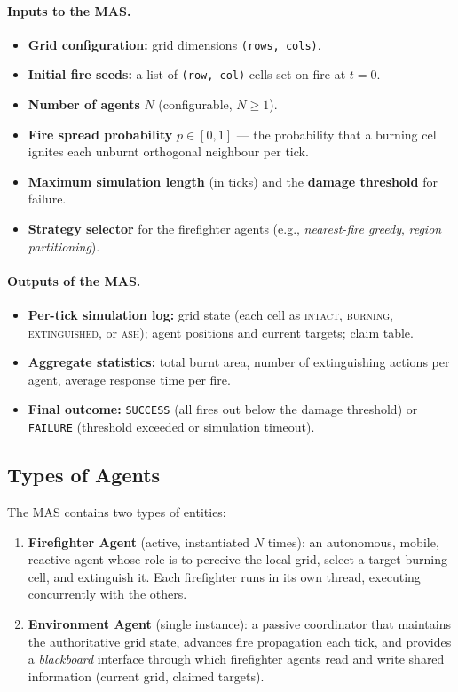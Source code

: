 \documentclass[a4paper, 11pt]{article}
\begin{document}
\paragraph{Inputs to the MAS.}
\begin{itemize}[leftmargin=*]
\item \textbf{Grid configuration:} grid dimensions \texttt{(rows, cols)}.
\item \textbf{Initial fire seeds:} a list of \texttt{(row, col)} cells set
on fire at $t=0$.
\item \textbf{Number of agents} $N$ (configurable, $N \geq 1$).
\item \textbf{Fire spread probability} $p \in [0, 1]$ --- the probability
that a burning cell ignites each unburnt orthogonal neighbour per tick.
\item \textbf{Maximum simulation length} (in ticks) and the
\textbf{damage threshold} for failure.
\item \textbf{Strategy selector} for the firefighter agents
(e.g., \emph{nearest-fire greedy}, \emph{region partitioning}).
\end{itemize}

\paragraph{Outputs of the MAS.}
\begin{itemize}[leftmargin=*]
\item \textbf{Per-tick simulation log:} grid state (each cell as
\textsc{intact}, \textsc{burning}, \textsc{extinguished}, or
\textsc{ash}); agent positions and current targets; claim table.
\item \textbf{Aggregate statistics:} total burnt area, number of
extinguishing actions per agent, average response time per fire.
\item \textbf{Final outcome:} \texttt{SUCCESS} (all fires out below the
damage threshold) or \texttt{FAILURE} (threshold exceeded or simulation
timeout).
\end{itemize}

\subsection{Types of Agents}

The MAS contains two types of entities:

\begin{enumerate}
\item \textbf{Firefighter Agent} (active, instantiated $N$ times):
an autonomous, mobile, reactive agent whose role is to perceive the local
grid, select a target burning cell, and extinguish it. Each firefighter
runs in its own thread, executing concurrently with the others.
\item \textbf{Environment Agent} (single instance): a passive coordinator
that maintains the authoritative grid state, advances fire propagation
each tick, and provides a \emph{blackboard} interface through which
firefighter agents read and write shared information (current grid,
claimed targets).
\end{enumerate}
\end{document}
